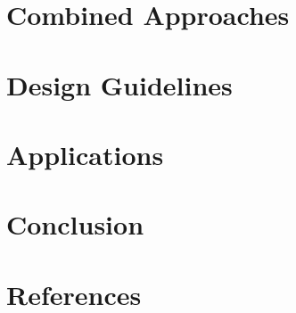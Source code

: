 \documentclass[12pt,a4paper]{article}
\begin{document}
    \section{Combined Approaches}

    \section{Design Guidelines}

    \section{Applications}

    \section{Conclusion}

    \section*{References}
        
        
        
    
    
\end{document}
